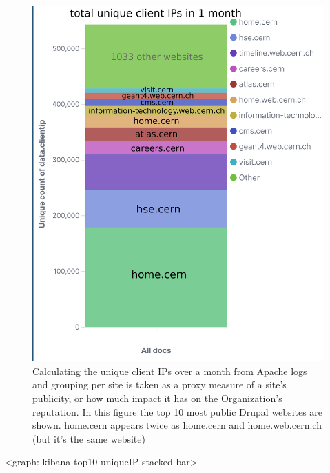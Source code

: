 \begin{figure}[h]
\centering
\includegraphics[width=.5\textwidth]{figures/drupal-top10-uniqClientIP.png}
\caption{Calculating the unique client IPs over a month from Apache logs and grouping per site
is taken as a proxy measure of a site's publicity, or how much impact it has on the Organization's reputation.
In this figure the top 10 most public Drupal websites are shown.
home.cern appears twice as home.cern and home.web.cern.ch (but it's the same website)
}
\label{fig-1}       %
\end{figure}
<graph: kibana top10 uniqueIP stacked bar> %

